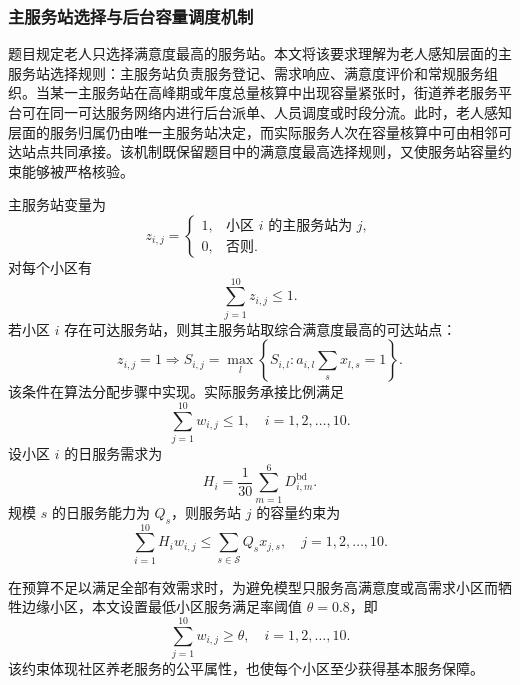 \subsubsection{主服务站选择与后台容量调度机制}

题目规定老人只选择满意度最高的服务站。本文将该要求理解为老人感知层面的主服务站选择规则：主服务站负责服务登记、需求响应、满意度评价和常规服务组织。当某一主服务站在高峰期或年度总量核算中出现容量紧张时，街道养老服务平台可在同一可达服务网络内进行后台派单、人员调度或时段分流。此时，老人感知层面的服务归属仍由唯一主服务站决定，而实际服务人次在容量核算中可由相邻可达站点共同承接。该机制既保留题目中的满意度最高选择规则，又使服务站容量约束能够被严格核验。

主服务站变量为
\begin{equation}
 z_{i,j}=\begin{cases}
1, & \text{小区 }i\text{ 的主服务站为 }j,\\
0, & \text{否则}.
\end{cases}
\end{equation}
对每个小区有
\begin{equation}
\sum_{j=1}^{10}z_{i,j}\leq 1.
\end{equation}
若小区 $i$ 存在可达服务站，则其主服务站取综合满意度最高的可达站点：
\begin{equation}
z_{i,j}=1\Rightarrow S_{i,j}=\max_{l}\left\{S_{i,l}:a_{i,l}\sum_s x_{l,s}=1\right\}.
\end{equation}
该条件在算法分配步骤中实现。实际服务承接比例满足
\begin{equation}
\sum_{j=1}^{10}w_{i,j}\leq 1,\quad i=1,2,\ldots,10.
\end{equation}
设小区 $i$ 的日服务需求为
\begin{equation}
H_i=\frac{1}{30}\sum_{m=1}^{6}D_{i,m}^{\mathrm{bd}}.
\end{equation}
规模 $s$ 的日服务能力为 $Q_s$，则服务站 $j$ 的容量约束为
\begin{equation}
\sum_{i=1}^{10}H_iw_{i,j}\leq \sum_{s\in\mathcal{S}}Q_sx_{j,s},\quad j=1,2,\ldots,10.
\label{eq:capacity}
\end{equation}

在预算不足以满足全部有效需求时，为避免模型只服务高满意度或高需求小区而牺牲边缘小区，本文设置最低小区服务满足率阈值 $\theta=0.8$，即
\begin{equation}
\sum_{j=1}^{10}w_{i,j}\geq \theta,\quad i=1,2,\ldots,10.
\label{eq:fairness}
\end{equation}
该约束体现社区养老服务的公平属性，也使每个小区至少获得基本服务保障。

